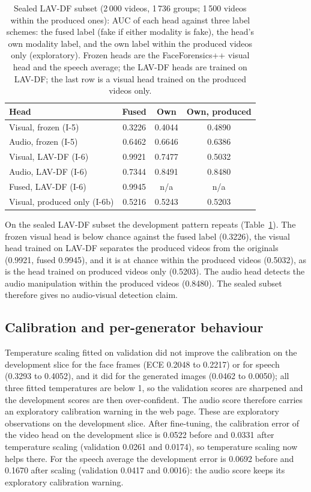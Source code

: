 \documentclass[conference,a4paper]{IEEEtran_nodash}
\begin{document}
\begin{table}[!t]
\centering
\caption[Sealed LAV-DF subset]{Sealed LAV-DF subset (2\,000 videos, 1\,736 groups; 1\,500 videos
within the produced ones): AUC of each head against three label schemes: the fused label (fake if
either modality is fake), the head's own modality label, and the own label within
the produced videos only (exploratory). Frozen heads are the FaceForensics++ visual head and the speech
average; the LAV-DF heads are trained on LAV-DF; the last row is a visual head
trained on the produced videos only.}
\label{tab:lavdfsealed}
\footnotesize
\setlength{\tabcolsep}{2pt}
\begin{tabular}{@{}l c c c@{}}
\toprule
Head & Fused & Own & Own, produced \\
\midrule
Visual, frozen (I-5) & 0.3226 & 0.4044 & 0.4890 \\
Audio, frozen (I-5) & 0.6462 & 0.6646 & 0.6386 \\
Visual, LAV-DF (I-6) & 0.9921 & 0.7477 & 0.5032 \\
Audio, LAV-DF (I-6) & 0.7344 & 0.8491 & 0.8480 \\
Fused, LAV-DF (I-6) & 0.9945 & n/a & n/a \\
Visual, produced only (I-6b) & 0.5216 & 0.5243 & 0.5203 \\
\bottomrule
\end{tabular}
\end{table}

On the sealed LAV-DF subset the development pattern repeats (Table~\ref{tab:lavdfsealed}).
The frozen visual head is below chance against the fused label (0.3226), the
visual head trained on LAV-DF separates the produced videos from the originals
(0.9921, fused 0.9945), and it is at chance within the produced videos (0.5032),
as is the head trained on produced videos only (0.5203). The audio head detects
the audio manipulation within the produced videos (0.8480). The sealed subset
therefore gives no audio-visual detection claim. %

\subsection{Calibration and per-generator behaviour}
Temperature scaling fitted on validation did not improve the calibration on the
development slice for the face frames (ECE 0.2048 to 0.2217) or for speech
(0.3293 to 0.4052), and it did for the generated images (0.0462 to 0.0050); all
three fitted temperatures are below 1, so the validation scores are sharpened and
the development scores are then over-confident. The audio score therefore
carries an exploratory calibration warning in the web page. These are
exploratory observations on the development slice. After fine-tuning, the
calibration error of the video head on the development slice is 0.0522 before
and 0.0331 after temperature scaling (validation 0.0261 and 0.0174), so
temperature scaling now helps there. For the speech average the development
error is 0.0692 before and 0.1670 after scaling (validation 0.0417 and 0.0016):
the audio score keeps its exploratory calibration warning.
\end{document}
